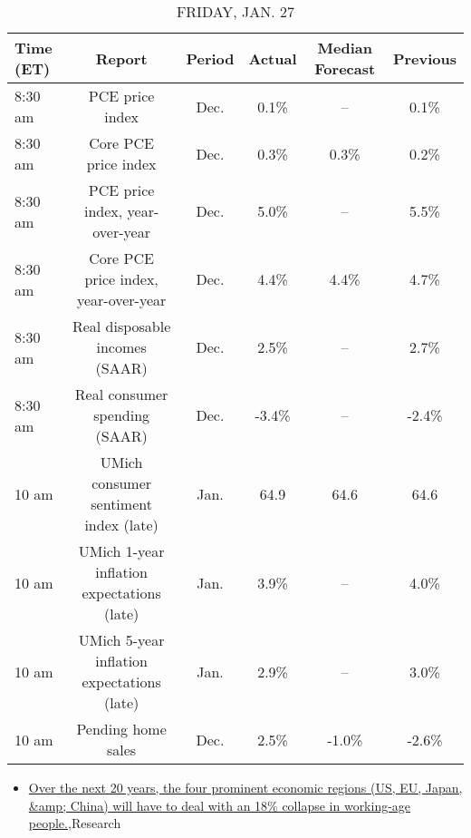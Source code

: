\documentclass{article}%
\begin{document}
\begin{table}[htbp]%
\caption{FRIDAY, JAN. 27}%
\centering%
\begin{adjustbox}{width=1\textwidth}%
\begin{tabular}{lccccc}
\toprule
Time (ET) &                                     Report & Period & Actual & Median Forecast & Previous \\
\midrule
  8:30 am &                            PCE price index &   Dec. &   0.1\% &              -- &     0.1\% \\
  8:30 am &                       Core PCE price index &   Dec. &   0.3\% &            0.3\% &     0.2\% \\
  8:30 am &            PCE price index, year-over-year &   Dec. &   5.0\% &              -- &     5.5\% \\
  8:30 am &       Core PCE price index, year-over-year &   Dec. &   4.4\% &            4.4\% &     4.7\% \\
  8:30 am &             Real disposable incomes (SAAR) &   Dec. &   2.5\% &              -- &     2.7\% \\
  8:30 am &              Real consumer spending (SAAR) &   Dec. &  -3.4\% &              -- &    -2.4\% \\
    10 am &      UMich consumer sentiment index (late) &   Jan. &   64.9 &            64.6 &     64.6 \\
    10 am & UMich 1-year inflation expectations (late) &   Jan. &   3.9\% &              -- &     4.0\% \\
    10 am & UMich 5-year inflation expectations (late) &   Jan. &   2.9\% &              -- &     3.0\% \\
    10 am &                         Pending home sales &   Dec. &   2.5\% &           -1.0\% &    -2.6\% \\
\bottomrule
\end{tabular}
%
\end{adjustbox}%
\end{table}

%
\begin{itemize}%
\item%
\href{https://reddit.com/r/Economics/comments/10n5azl/over\_the\_next\_20\_years\_the\_four\_prominent/}{Over the next 20 years, the four prominent economic regions (US, EU, Japan, \&amp; China) will have to deal with an 18\% collapse in working-age people.},Research%
\end{itemize}%
\end{document}
